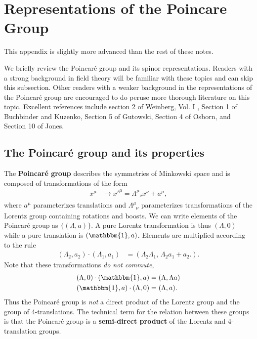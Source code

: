 \chapter{Representations of the Poincare Group}
\label{sec:Poincare:Algebra}

This appendix is slightly more advanced than the rest of these notes.


% 
We briefly review the Poincar\'e group and its spinor representations. 
%
Readers with a strong background in field theory will be familiar with these topics and can skip this subsection. Other readers with a weaker background in the representations of the Poincar\'e group are encouraged to do peruse more thorough literature on this topic. Excellent references include section 2 of Weinberg, Vol. I \autocite{weinberg}, Section 1 of Buchbinder and Kuzenko\autocite{Buchbinder:1998qv}, Section 5 of Gutowski\autocite{gutowski}, Section 4 of Osborn\autocite{Osborn:Symmetries}, and Section 10 of Jones\autocite{JonesGroups}. 

\section{The Poincar\'e group and its properties}

The \textbf{Poincar\'e group} describes the symmetries of Minkowski space and is composed of transformations of the form
\begin{align}
    x^\mu &\rightarrow x'^\mu = \Lambda^\mu_{\phantom{\mu}\nu} x^\nu + a^\mu,
\end{align}
where $a^\mu$ parameterizes translations and $\Lambda^\mu_{\phantom{\mu}\nu}$ parameterizes transformations of the Lorentz group  containing rotations and boosts. 
%
We can write elements of the Poincar\'e group as $\{(\Lambda,a)\}$. A pure Lorentz transformation is thus $(\Lambda,0)$ while a pure translation is $(\mathbbm{1},a)$. 
%
Elements are multiplied according to the rule
\begin{align}
    (\Lambda_2,a_2)\cdot(\Lambda_1,a_1) &= (\Lambda_2\Lambda_1,\,\Lambda_2 a_1 + a_2.).\label{eq:SUSYalg:Poincar\'e:multiplication}
\end{align}
%
Note that these transformations \textit{do not commute},
\begin{align}
    (\Lambda,0)\cdot (\mathbbm{1},a) &= (\Lambda,\Lambda a)\\
    (\mathbbm{1},a)\cdot(\Lambda,0) &= (\Lambda,a).
\end{align}
Thus the Poincar\'e group is \textit{not} a direct product of the Lorentz group and the group of 4-translations. The technical term for the relation between these groups is that the Poincar\'e group is a \textbf{semi-direct product} of the Lorentz and 4-translation groups.

